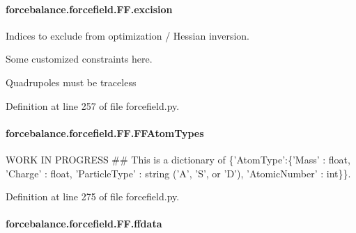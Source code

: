\hypertarget{classforcebalance_1_1forcefield_1_1FF_ad573c583207080fa66592bcbf788cbad}{
\paragraph[{excision}]{\setlength{\rightskip}{0pt plus 5cm}forcebalance.\-forcefield.\-F\-F.\-excision}}\label{classforcebalance_1_1forcefield_1_1FF_ad573c583207080fa66592bcbf788cbad}


Indices to exclude from optimization / Hessian inversion. 

Some customized constraints here.

Quadrupoles must be traceless 

Definition at line 257 of file forcefield.\-py.

\hypertarget{classforcebalance_1_1forcefield_1_1FF_a38e238188fdd105477cd3ad38ca3753b}{
\paragraph[{F\-F\-Atom\-Types}]{\setlength{\rightskip}{0pt plus 5cm}forcebalance.\-forcefield.\-F\-F.\-F\-F\-Atom\-Types}}\label{classforcebalance_1_1forcefield_1_1FF_a38e238188fdd105477cd3ad38ca3753b}


W\-O\-R\-K I\-N P\-R\-O\-G\-R\-E\-S\-S \#\# This is a dictionary of \{'Atom\-Type'\-:\{'Mass' \-: float, 'Charge' \-: float, 'Particle\-Type' \-: string ('A', 'S', or 'D'), 'Atomic\-Number' \-: int\}\}. 



Definition at line 275 of file forcefield.\-py.

\hypertarget{classforcebalance_1_1forcefield_1_1FF_aa33e01455044a76e265e6eafbf9c90d6}{
\paragraph[{ffdata}]{\setlength{\rightskip}{0pt plus 5cm}forcebalance.\-forcefield.\-F\-F.\-ffdata}}\label{classforcebalance_1_1forcefield_1_1FF_aa33e01455044a76e265e6eafbf9c90d6}


